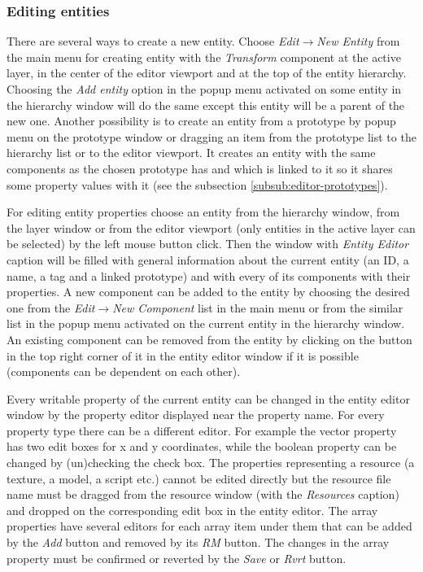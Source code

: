 \subsubsection{Editing entities}
\label{subsub:editor-entities}

There are several ways to create a new entity. Choose \emph{Edit}$\rightarrow$\emph{New Entity} from the main menu for creating entity with the \emph{Transform} component at the active layer, in the center of the editor viewport and at the top of the entity hierarchy. Choosing the \emph{Add entity} option in the popup menu activated on some entity in the hierarchy window will do the same except this entity will be a parent of the new one. Another possibility is to create an entity from a prototype by popup menu on the prototype window or dragging an item from the prototype list to the hierarchy list or to the editor viewport. It creates an entity with the same components as the chosen prototype has and which is linked to it so it shares some property values with it (see the subsection \ref{subsub:editor-prototypes}).

For editing entity properties choose an entity from the hierarchy window, from the layer window or from the editor viewport (only entities in the active layer can be selected) by the left mouse button click. Then the window with \emph{Entity Editor} caption will be filled with general information about the current entity (an ID, a name, a tag and a linked prototype) and with every of its components with their properties. A new component can be added to the entity by choosing the desired one from the \emph{Edit}$\rightarrow$\emph{New Component} list in the main menu or from the similar list in the popup menu activated on the current entity in the hierarchy window. An existing component can be removed from the entity by clicking on the button in the top right corner of it in the entity editor window if it is possible (components can be dependent on each other).

Every writable property of the current entity can be changed in the entity editor window by the property editor displayed near the property name. For every property type there can be a different editor. For example the vector property has two edit boxes for x and y coordinates, while the boolean property can be changed by (un)checking the check box. The properties representing a resource (a texture, a model, a script etc.) cannot be edited directly but the resource file name must be dragged from the resource window (with the \emph{Resources} caption) and dropped on the corresponding edit box in the entity editor. The array properties have several editors for each array item under them that can be added by the \emph{Add} button and removed by its \emph{RM} button. The changes in the array property must be confirmed or reverted by the \emph{Save} or \emph{Rvrt} button.

